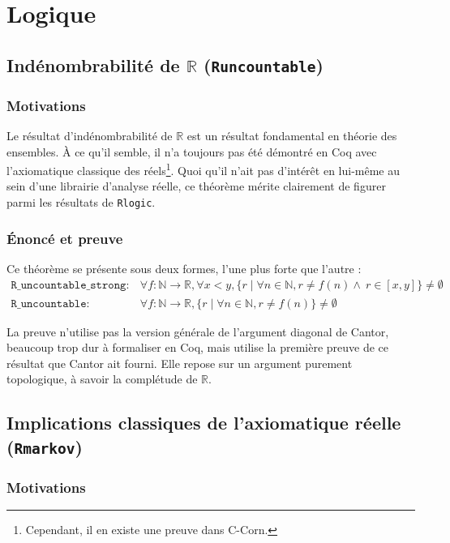 \documentclass{article}
\newcommand{\coqcode}[1]{\texttt{#1}}
\begin{document}
\section{Logique}

\subsection{Indénombrabilité de $\mathbb{R}$ (\coqcode{Runcountable})}

\subsubsection{Motivations}

Le résultat d'indénombrabilité de $\mathbb{R}$ est un résultat fondamental en théorie des ensembles. À ce qu'il semble, il n'a toujours pas été démontré en Coq avec l'axiomatique classique des réels\footnote{Cependant, il en existe une preuve dans C-Corn.}. Quoi qu'il n'ait pas d'intérêt en lui-même au sein d'une librairie d'analyse réelle, ce théorème mérite clairement de figurer parmi les résultats de \coqcode{Rlogic}.

\subsubsection{Énoncé et preuve}

Ce théorème se présente sous deux formes, l'une plus forte que l'autre :
$$\begin{array}{ll}
\mathtt{R\_uncountable\_strong} :& \forall f : \mathbb{N}\rightarrow\mathbb{R}, \forall x < y, \{r\mid\forall n\in\mathbb{N}, r \neq f(n) \wedge\ r\in[x, y]\}\neq\emptyset\\
\mathtt{R\_uncountable} :& \forall f : \mathbb{N}\rightarrow\mathbb{R}, \{r\mid\forall n\in\mathbb{N}, r \neq f(n)\}\neq\emptyset
\end{array}$$

La preuve n'utilise pas la version générale de l'argument diagonal de Cantor, beaucoup trop dur à formaliser en Coq, mais utilise la première preuve de ce résultat que Cantor ait fourni. Elle repose sur un argument purement topologique, à savoir la complétude de $\mathbb{R}$.

\subsection{Implications classiques de l'axiomatique réelle (\coqcode{Rmarkov})}

\subsubsection{Motivations}
\end{document}

